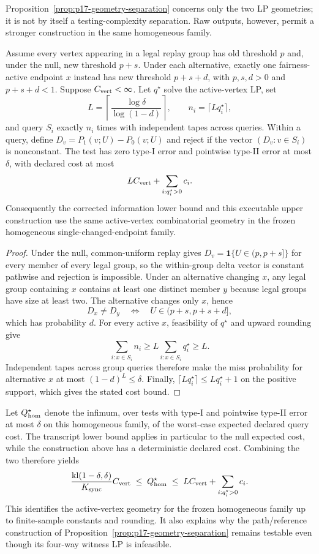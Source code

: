 Proposition~\ref{prop:p17-geometry-separation} concerns only the two LP
geometries; it is not by itself a testing-complexity separation.  Raw outputs,
however, permit a stronger construction in the same homogeneous family.

\begin{proposition}
\label{prop:p17-active-contrast}
Assume every vertex appearing in a legal replay group has old threshold $p$
and, under the null, new threshold $p+s$.  Under each alternative, exactly one
fairness-active endpoint $x$ instead has new threshold $p+s+d$, with
$p,s,d>0$ and $p+s+d<1$.  Suppose $C_{\rm vert}<\infty$.  Let $q^\star$
solve the active-vertex LP, set
\[
L=\left\lceil\frac{\log\delta}{\log(1-d)}\right\rceil,
\qquad
n_i=\lceil Lq_i^\star\rceil,
\]
and query $S_i$ exactly $n_i$ times with independent tapes across queries.
Within a query, define $D_v=P_1(v;U)-P_0(v;U)$ and reject if the vector
$(D_v:v\in S_i)$ is nonconstant.  The test has zero type-I error and
pointwise type-II error at most $\delta$, with declared cost at most
\[
L C_{\rm vert}+\sum_{i:q_i^\star>0}c_i.
\]
Consequently the corrected information lower bound and this executable upper
construction use the same active-vertex combinatorial geometry in the frozen
homogeneous single-changed-endpoint family.
\end{proposition}

\begin{proof}
Under the null, common-uniform replay gives
$D_v=\mathbf 1\{U\in(p,p+s]\}$ for every member of every legal group, so
the within-group delta vector is constant pathwise and rejection is impossible.
Under an alternative changing $x$, any legal group containing $x$ contains at
least one distinct member $y$ because legal groups have size at least two.
The alternative changes only $x$, hence
\[
D_x\ne D_y
\quad\Longleftrightarrow\quad
U\in(p+s,p+s+d],
\]
which has probability $d$.  For every active $x$, feasibility of $q^\star$
and upward rounding give
\[
\sum_{i:x\in S_i}n_i
\ge L\sum_{i:x\in S_i}q_i^\star
\ge L.
\]
Independent tapes across group queries therefore make the miss probability for
alternative $x$ at most $(1-d)^L\le\delta$.  Finally,
$\lceil Lq_i^\star\rceil\le Lq_i^\star+1$ on the positive support,
which gives the stated cost bound.
\end{proof}

Let $Q^\star_{\rm hom}$ denote the infimum, over tests with type-I and
pointwise type-II error at most $\delta$ on this homogeneous family, of the
worst-case expected declared query cost.  The transcript lower bound applies in
particular to the null expected cost, while the construction above has a
deterministic declared cost.  Combining the two therefore yields
\[
\frac{\mathrm{kl}(1-\delta,\delta)}{K_{\rm sync}}C_{\rm vert}
\;\le\;
Q^\star_{\rm hom}
\;\le\;
L C_{\rm vert}+\sum_{i:q_i^\star>0}c_i.
\]
This identifies the active-vertex geometry for the frozen homogeneous family
up to finite-sample constants and rounding.  It also explains why the
path/reference construction of Proposition~\ref{prop:p17-geometry-separation}
remains testable even though its four-way witness LP is infeasible.

